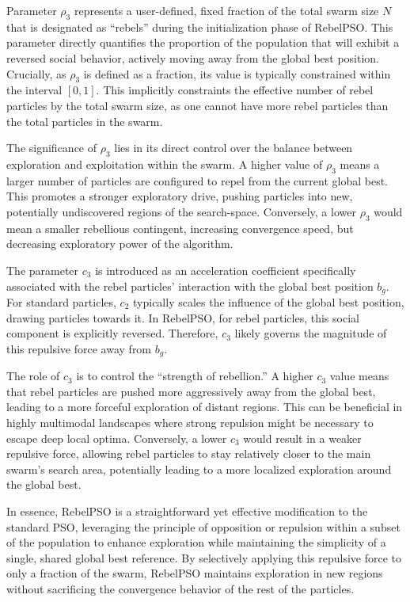 {Parameter $\rho_3$ represents a user-defined, fixed fraction of the total swarm size $N$ that is designated as ``rebels'' during the initialization phase of RebelPSO. This parameter directly quantifies the proportion of the population that will exhibit a reversed social behavior, actively moving away from the global best position.
Crucially, as $\rho_3$ is defined as a fraction, its value is typically constrained within the interval $[0,1]$.
This implicitly constraints the effective number of rebel particles by the total swarm size, as one cannot have more rebel particles than the total particles in the swarm.

The significance of $\rho_3$ lies in its direct control over the balance between exploration and exploitation within the swarm. A higher value of $\rho_3$ means a larger number of particles are configured to repel from the current global best. This promotes a stronger exploratory drive, pushing particles into new, potentially undiscovered regions of the \gls{search-space}. Conversely, a lower $\rho_3$ would mean a smaller rebellious contingent, increasing convergence speed, but decreasing exploratory power of the algorithm.

\enlargethispage{-.3\baselineskip}
The parameter $c_3$ is introduced as an acceleration coefficient specifically associated with the rebel particles' interaction with the global best position $b_g$. For standard particles, $c_2$ typically scales the influence of the global best position, drawing particles towards it. In RebelPSO, for rebel particles, this social component is explicitly reversed. Therefore, $c_3$ likely governs the magnitude of this repulsive force away from $b_g$.

The role of $c_3$ is to control the ``strength of rebellion.'' A higher $c_3$ value means that rebel particles are pushed more aggressively away from the global best, leading to a more forceful exploration of distant regions. This can be beneficial in highly multimodal landscapes where strong repulsion might be necessary to escape deep local optima. Conversely, a lower $c_3$ would result in a weaker repulsive force, allowing rebel particles to stay relatively closer to the main swarm's search area, potentially leading to a more localized exploration around the global best.

In essence, RebelPSO is a straightforward yet effective modification to the standard PSO, leveraging the principle of opposition or repulsion within a subset of the population to enhance exploration while maintaining the simplicity of a single, shared global best reference. By selectively applying this repulsive force to only a fraction of the swarm, RebelPSO maintains exploration in new regions without sacrificing the convergence behavior of the rest of the particles.

}
